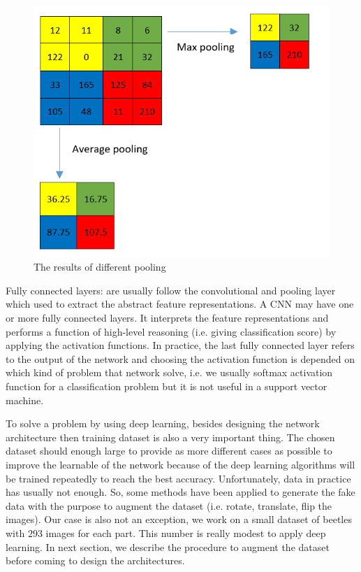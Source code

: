 \documentclass[review]{elsarticle}
\begin{document}
\begin{figure}[!h]
	\centering
	\includegraphics[scale=.5]{images/pooling}
	\caption{The results of different pooling}
	\label{imgcnn_pooling}
\end{figure}

Fully connected layers: are usually follow the convolutional and pooling layer which used to extract the abstract feature representations. A CNN may have one or more fully connected layers. It interprets the feature representations and performs a function of high-level reasoning (i.e. giving classification score) by applying the activation functions. In practice, the last fully connected layer refers to the output of the network and choosing the activation function is depended on which kind of problem that network solve, i.e. we usually softmax activation function for a classification problem but it is not useful in a support vector machine. 

To solve a problem by using deep learning, besides designing the network architecture then training dataset is also a very important thing. The chosen dataset should enough large to provide as more different cases as possible to improve the learnable of the network because of the deep learning algorithms will be trained repeatedly to reach the best accuracy. Unfortunately, data in practice has usually not enough. So, some methods have been applied to generate the fake data with the purpose to augment the dataset (i.e. rotate, translate, flip the images). Our case is also not an exception, we work on a small dataset of beetles with $293$ images for each part. This number is really modest to apply deep learning. In next section, we describe the procedure to augment the dataset before coming to design the architectures.
\end{document}
